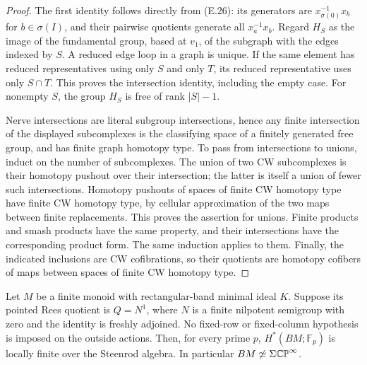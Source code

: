 \begin{proof}
The first identity follows directly from (E.26): its generators are
$x_{\sigma(0)}^{-1}x_b$ for $b\in\sigma(I)$, and their pairwise
quotients generate all $x_a^{-1}x_b$.  Regard $H_S$ as the image of
the fundamental group, based at $v_1$, of the subgraph with the
edges indexed by $S$.  A reduced edge loop in a graph is unique.
If the same element has reduced representatives using only $S$ and
only $T$, its reduced representative uses only $S\cap T$.
This proves the intersection identity, including the empty case.
For nonempty $S$, the group $H_S$ is free of rank $|S|-1$.

Nerve intersections are literal subgroup intersections, hence any
finite intersection of the displayed subcomplexes is the classifying
space of a finitely generated free group, and has finite graph
homotopy type.  To pass from intersections to unions, induct on the
number of subcomplexes.  The union of two CW subcomplexes is their
homotopy pushout over their intersection; the latter is itself a
union of fewer such intersections.  Homotopy pushouts of spaces of
finite CW homotopy type have finite CW homotopy type, by cellular
approximation of the two maps between finite replacements.
This proves the assertion for unions.  Finite products and smash
products have the same property, and their intersections have the
corresponding product form.  The same induction applies to them.
Finally, the indicated inclusions are CW cofibrations, so their
quotients are homotopy cofibers of maps between spaces of finite
CW homotopy type.
\end{proof}

\begin{theorem}\label{E:nilpotent-Rees-quotient}
Let $M$ be a finite monoid with rectangular-band minimal ideal $K$.
Suppose its pointed Rees quotient is $Q=N^1$, where $N$ is a finite
nilpotent semigroup with zero and the identity is freshly adjoined.
No fixed-row or fixed-column hypothesis is imposed on the outside
actions.  Then, for every prime $p$, $H^*(BM;\mathbb F_p)$ is locally
finite over the Steenrod algebra.  In particular $BM\not\simeq
\Sigma\mathbb {CP}^\infty$.
\end{theorem}



